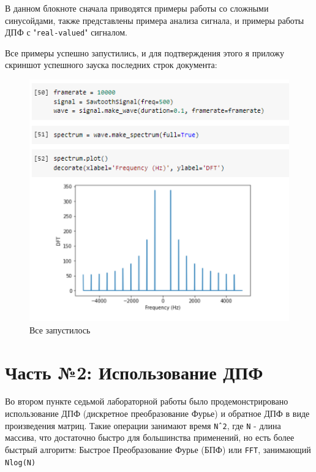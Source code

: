 \documentclass[a4paper]{article}
\begin{document}
            В данном блокноте сначала приводятся примеры работы со сложными синусойдами, также представлены примера анализа сигнала, и примеры работы ДПФ с "\texttt{real-valued}" сигналом.
            
            Все примеры успешно запустились, и для подтверждения этого я приложу скриншот успешного зауска последних строк документа:
            
             \begin{figure}[H]
                \centering
                \includegraphics[width=\textwidth]{ex_1_all_work.png}
                \caption{Все запустилось}
                \label{fig:ex_1_all_work}
            \end{figure}
            
    
    \newpage
        \section{Часть №2: Использование ДПФ}
            Во втором пункте седьмой лабораторной работы было продемонстрировано использование ДПФ (дискретное преобразование Фурье) и обратное ДПФ в виде произведения матриц. Такие операции занимают время \texttt{Nˆ2}, где \texttt{N} - длина массива, что достаточно быстро для большинства применений, но есть более быстрый алгоритм: Быстрое Преобразование Фурье (БПФ) или \texttt{FFT}, занимающий \texttt{Nlog(N)}
            
\end{document}
